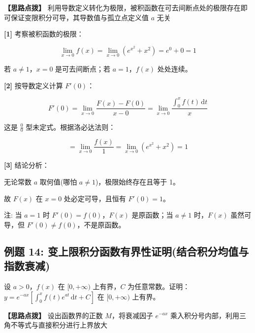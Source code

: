 \documentclass[11pt,a4paper,UTF8]{ctexart}
\begin{document}
\textbf{\color{DeepPurple}【思路点拨】} 利用导数定义转化为极限，被积函数在可去间断点处的极限存在即可保证变限积分可导，其导数值与孤立点定义值 $a$ 无关


\begin{solbox}[分步推导与答题规范]
\textbf{[1]} 考察被积函数的极限：


\begin{equation*}
\lim_{x \to 0} f(x) = \lim_{x \to 0} (e^{x^2} + x^2) = e^0 + 0 = 1
\end{equation*}


若 $a \neq 1$，$x = 0$ 是可去间断点；若 $a = 1$，$f(x)$ 处处连续。

\textbf{[2]} 按导数定义计算 $F'(0)$：


\begin{equation*}
F'(0) = \lim_{x \to 0} \frac{F(x) - F(0)}{x - 0} = \lim_{x \to 0} \frac{\int_0^x f(t)\,\mathrm{d}t}{x}
\end{equation*}


这是 $\frac{0}{0}$ 型未定式。根据洛必达法则：


\begin{equation*}
= \lim_{x \to 0} \frac{f(x)}{1} = \lim_{x \to 0} (e^{x^2} + x^2) = 1
\end{equation*}


\textbf{[3]} 结论分析：

无论常数 $a$ 取何值(哪怕 $a \neq 1$)，极限始终存在且等于 1。

故 $F(x)$ 在 $x = 0$ 处必定可导，且恒有 $F'(0) = 1$。

注: 当 $a = 1$ 时 $F'(0) = f(0)$，$F(x)$ 是原函数；当 $a \neq 1$ 时，$F(x)$ 虽然可导，但 $F'(0) \neq f(0)$，不是原函数。
\end{solbox}


\subsection{例题 14: 变上限积分函数有界性证明(结合积分均值与指数衰减)}

设 $a > 0$，$f(x)$ 在 $[0, +\infty)$ 上有界，$C$ 为任意常数。证明：$y = e^{-ax}\left[ \int_0^x f(t)e^{at}\,\mathrm{d}t + C \right]$ 在 $[0, +\infty)$ 上有界。

\textbf{\color{DeepPurple}【思路点拨】} 设出函数界的正数 $M$，将衰减因子 $e^{-ax}$ 乘入积分号内部，利用三角不等式与直接积分进行上界放大
\end{document}
